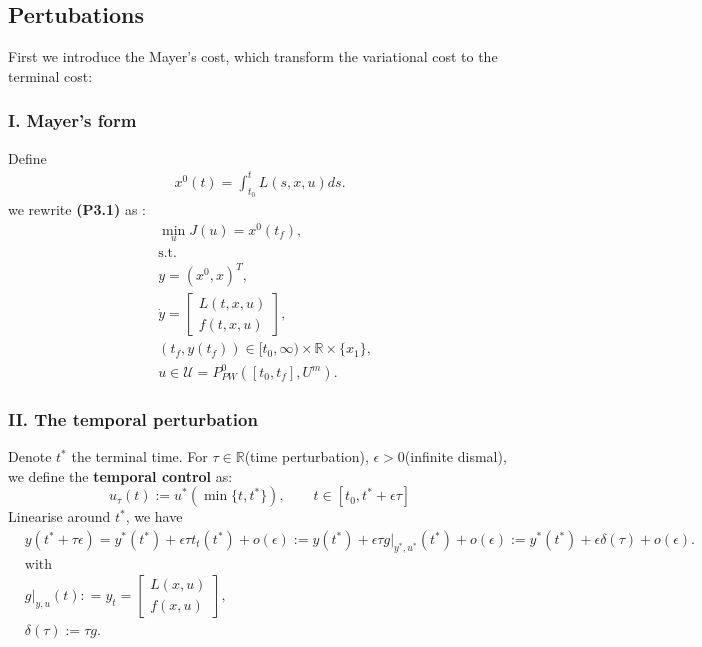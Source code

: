 \documentclass[a4paper,11pt,fleqn]{book}
\theoremstyle{definition}
\theoremstyle{remark}
\begin{document}
\subsection{Pertubations}
First we introduce the Mayer's cost, which transform the variational cost to the terminal cost:
\subsubsection{I. Mayer's form}
Define
\begin{align*}
	x^0(t) = \int_{t_0}^t L(s, x, u) ds.
\end{align*}
we rewrite \textbf{(P3.1)} as : 
\begin{equation}
\begin{aligned}
	& \min_u J (u) = x^0(t_f),\\
	& \text{s.t.}\\
	& y = (x^0, x)^T,\\
	& \dot{y} = 
		\begin{bmatrix}
		L(t, x, u) \\
		f(t, x, u)
		\end{bmatrix},\\
	& (t_f, y(t_f)) \in [t_0, \infty) \times \mathbb{R} \times \{x_1\}, \\
	& u \in \mathcal{U} = P^0_{PW}([t_0, t_f], U^m).
\end{aligned}
\end{equation}


\subsubsection{II. The temporal perturbation}
Denote $t^*$ the terminal time. For $\tau \in \mathbb{R}$(time perturbation), $\epsilon > 0$(infinite dismal), we define the \textbf{temporal control} as:
\begin{equation}
u_\tau(t):= u^* (\min\{t, t^* \}), \qquad t \in [t_0, t^* + \epsilon \tau]
\end{equation}
Linearise around $t^*$, we have
\begin{align*}
	&y(t^* + \tau\epsilon) = y^*(t^*) + \epsilon \tau t_t(t^*) + o(\epsilon) := y(t^*) + \epsilon \tau  g|_{y^*, u^*}(t^*) + o(\epsilon) := y^*(t^*) + \epsilon \delta(\tau) + o(\epsilon). \\
	&\text{with }\\
	& g|_{y, u}(t): = y_t = 
	\begin{bmatrix}
		L(x, u)\\
		f(x, u)
	\end{bmatrix},\\
	&\delta(\tau):= \tau g. \\
\end{align*}
\end{document}
